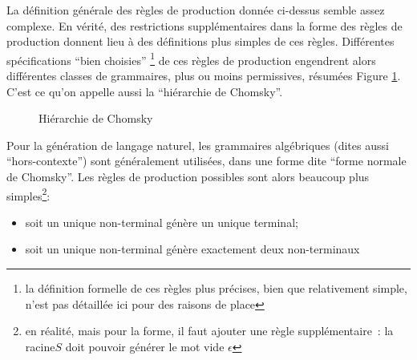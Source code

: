 \documentclass{article}
\begin{document}
				La définition générale des règles de production donnée ci-dessus semble assez complexe. En vérité, des restrictions supplémentaires dans la forme des règles de production donnent lieu à des définitions plus simples de ces règles. Différentes spécifications ``bien choisies'' \footnote{la définition formelle de ces règles plus précises, bien que relativement simple, n'est pas détaillée ici pour des raisons de place} de ces règles de production engendrent alors différentes classes de grammaires, plus ou moins permissives, résumées Figure \ref{fig:chomsky_hierarchy}. C'est ce qu'on appelle aussi la ``hiérarchie de Chomsky''.
				\begin{figure}
					\centering
						\caption{Hiérarchie de Chomsky}
						\label{fig:chomsky_hierarchy}
					\end{figure}
					Pour la génération de langage naturel, les grammaires algébriques (dites aussi ``hors-contexte'') sont généralement utilisées, dans une forme dite ``forme normale de Chomsky''. Les règles de production possibles sont alors beaucoup plus simples\footnote{en réalité, mais pour la forme, il faut ajouter une règle supplémentaire~: la racine$S$ doit pouvoir générer le mot vide $\epsilon$}:
				\vspace{2mm}
				\begin{itemize}
					\item soit un unique non-terminal génère un unique terminal;
					\item soit un unique non-terminal génère exactement deux non-terminaux
				\end{itemize}
\end{document}
